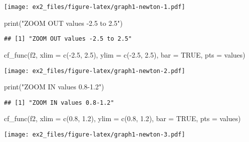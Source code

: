 \documentclass[
]{article}
\newenvironment{Shaded}{\begin{snugshade}}{\end{snugshade}}
\newcommand{\AttributeTok}[1]{\textcolor[rgb]{0.77,0.63,0.00}{#1}}
\newcommand{\ConstantTok}[1]{\textcolor[rgb]{0.00,0.00,0.00}{#1}}
\newcommand{\FloatTok}[1]{\textcolor[rgb]{0.00,0.00,0.81}{#1}}
\newcommand{\FunctionTok}[1]{\textcolor[rgb]{0.00,0.00,0.00}{#1}}
\newcommand{\NormalTok}[1]{#1}
\newcommand{\SpecialCharTok}[1]{\textcolor[rgb]{0.00,0.00,0.00}{#1}}
\newcommand{\StringTok}[1]{\textcolor[rgb]{0.31,0.60,0.02}{#1}}
\begin{document}
\texttt{[image: ex2\_files/figure-latex/graph1-newton-1.pdf]}

\begin{Shaded}
\begin{Highlighting}[]
\FunctionTok{print}\NormalTok{(}\StringTok{"ZOOM OUT values {-}2.5 to 2.5"}\NormalTok{)}
\end{Highlighting}
\end{Shaded}

\begin{verbatim}
## [1] "ZOOM OUT values -2.5 to 2.5"
\end{verbatim}

\begin{Shaded}
\begin{Highlighting}[]
\FunctionTok{cf\_func}\NormalTok{(f2, }\AttributeTok{xlim =} \FunctionTok{c}\NormalTok{(}\SpecialCharTok{{-}}\FloatTok{2.5}\NormalTok{, }\FloatTok{2.5}\NormalTok{), }\AttributeTok{ylim =} \FunctionTok{c}\NormalTok{(}\SpecialCharTok{{-}}\FloatTok{2.5}\NormalTok{, }\FloatTok{2.5}\NormalTok{), }\AttributeTok{bar =} \ConstantTok{TRUE}\NormalTok{, }\AttributeTok{pts =}\NormalTok{ values)}
\end{Highlighting}
\end{Shaded}

\texttt{[image: ex2\_files/figure-latex/graph1-newton-2.pdf]}

\begin{Shaded}
\begin{Highlighting}[]
\FunctionTok{print}\NormalTok{(}\StringTok{"ZOOM IN values 0.8{-}1.2"}\NormalTok{)}
\end{Highlighting}
\end{Shaded}

\begin{verbatim}
## [1] "ZOOM IN values 0.8-1.2"
\end{verbatim}

\begin{Shaded}
\begin{Highlighting}[]
\FunctionTok{cf\_func}\NormalTok{(f2, }\AttributeTok{xlim =} \FunctionTok{c}\NormalTok{(}\FloatTok{0.8}\NormalTok{, }\FloatTok{1.2}\NormalTok{), }\AttributeTok{ylim =} \FunctionTok{c}\NormalTok{(}\FloatTok{0.8}\NormalTok{, }\FloatTok{1.2}\NormalTok{), }\AttributeTok{bar =} \ConstantTok{TRUE}\NormalTok{, }\AttributeTok{pts =}\NormalTok{ values)}
\end{Highlighting}
\end{Shaded}

\texttt{[image: ex2\_files/figure-latex/graph1-newton-3.pdf]}
\end{document}
